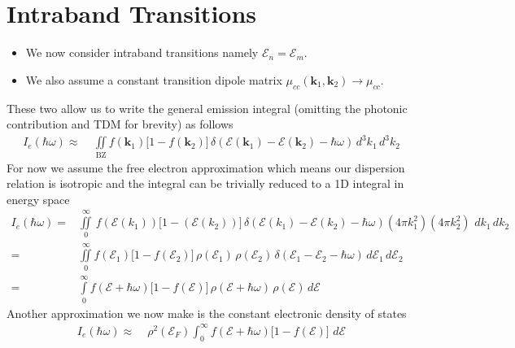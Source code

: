 \newpage
\section{Intraband Transitions}
\label{sec:intraband_transitions}

\begin{itemize}
  \item We now consider intraband transitions namely $\mathcal{E}_{n}=\mathcal{E}_{m}$.
  \item We also assume a constant transition dipole matrix $\mu_{cc}(\mathbf{k}_{1},\mathbf{k}_{2})\to\mu_{cc}$.
\end{itemize}

These two allow us to write the general emission integral (omitting the photonic contribution and TDM for brevity) as follows
\begin{equation}
\begin{aligned}
I_{e}(\hbar\omega) \approx\;& \iint\limits_{\text{BZ}} 
 f(\mathbf{k}_{1})\big[1-f(\mathbf{k}_{2})\big]\,
\delta\!\left(\mathcal{E}(\mathbf{k}_{1})-\mathcal{E}(\mathbf{k}_{2})-\hbar\omega\right)\,
 d^{3}k_{1}\, d^{3}k_{2}
\end{aligned}
\label{eq:intraband_general_emission}
\end{equation}
For now we assume the free electron approximation which means our dispersion relation is isotropic and the integral can be trivially reduced to a 1D integral in energy space
\begin{align}
I_{e}(\hbar\omega) =& \iint\limits_{0}^{\infty} \,
 f(\mathcal{E}(k_{1}))\big[1-(\mathcal{E}(k_{2}))\big]\,
\delta\!\left(\mathcal{E}(k_{1})-\mathcal{E}(k_{2})-\hbar\omega\right)(4\pi k_{1}^{2})(4\pi k_{2}^{2}) \,\, 
 dk_{1}\, dk_{2}
\label{eq:intraband_k_space}\\
=\;& \iint\limits_{0}^{\infty}
 f(\mathcal{E}_{1})\big[1-f(\mathcal{E}_{2})\big]\,
 \rho(\mathcal{E}_{1})\, \rho(\mathcal{E}_{2})\,
 \delta\!\left(\mathcal{E}_{1}-\mathcal{E}_{2}-\hbar\omega\right)\,
 d\mathcal{E}_{1}\, d\mathcal{E}_{2}
\label{eq:intraband_energy_double}\\
=\;& \int\limits_{0}^{\infty}
 f(\mathcal{E}+\hbar\omega)\big[1-f(\mathcal{E})\big]\,
 \rho(\mathcal{E}+\hbar\omega)\, \rho(\mathcal{E})\,
 d\mathcal{E}
\label{eq:intraband_energy_single}
\end{align}
Another approximation we now make is the constant electronic density of states
\begin{equation}
\begin{aligned}
I_{e}(\hbar\omega)\approx\; &\rho^{2}(\mathcal{E}_{F})\int_{0}^{\infty}
 f(\mathcal{E}+\hbar\omega)\big[1-f(\mathcal{E})\big]\,
\, d\mathcal{E}
\end{aligned}
\label{eq:intraband_constant_edos}
\end{equation}
